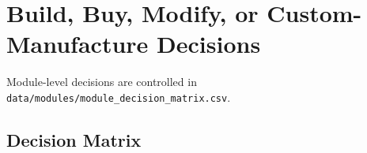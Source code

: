 \chapter{Build, Buy, Modify, or Custom-Manufacture Decisions}

Module-level decisions are controlled in \texttt{data/modules/module\_decision\_matrix.csv}.

\section{Decision Matrix}



